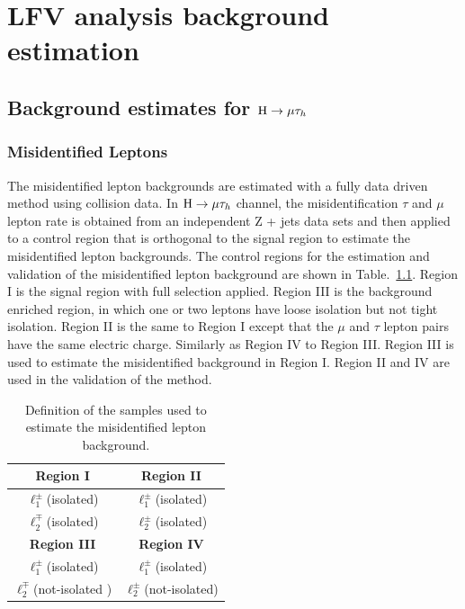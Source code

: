 \chapter{LFV analysis background estimation}

\section{Background estimates for $\mathrm{H}\to \mu\tau_{h}$}

\subsection{Misidentified Leptons}

The misidentified lepton backgrounds are estimated with a fully data driven method using collision data. In $\mathrm{H}\to \mu\tau_{h}$ channel, the misidentification $\tau$ and $\mu$ lepton rate is obtained from an independent Z + jets data sets and then applied to a control region that is orthogonal to the signal region to estimate the misidentified lepton backgrounds.  The control regions for the estimation and validation of the misidentified lepton background are shown in Table.~\ref{tab:fakeratediagram}. Region I is the signal region with full selection applied. Region III is the background enriched region, in which one or two leptons have loose isolation but not tight isolation. Region II is the same to Region I except that the $\mu$ and $\tau$ lepton pairs have the same electric charge. Similarly as Region IV to Region III. Region III is used to estimate the misidentified background in Region I. Region II and IV are used in the validation of the method. 


\begin{table}[hbt!]
 \centering
 {
 \renewcommand{\arraystretch}{1.1}
 \caption{Definition of the samples used to estimate the misidentified lepton background.}
  \label{tab:fakeratediagram}
  \begin{tabular}{c|c} \hline
\textbf{Region I}              &  \textbf{Region II}             \\ \hline
$\ell^{\pm}_{1}$(isolated)  &  $\ell^{\pm}_{1}$(isolated)             \\
$\ell^{\mp}_{2}$(isolated)  &  $\ell^{\pm}_{2}$(isolated)             \\

\hline \hline
\textbf{Region III}           &  \textbf{Region IV}             \\ \hline
$\ell^{\pm}_{1}$(isolated)  &  $\ell^{\pm}_{1}$(isolated)             \\
$\ell^{\mp}_{2}$(not-isolated )  &  $\ell^{\pm}_{2}$(not-isolated)             \\
\hline
  \end{tabular}
}
\end{table}



